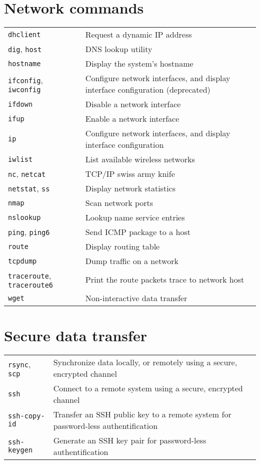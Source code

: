 \documentclass[10pt]{article}
\begin{document}
\begin{multicols}{2}

\section{Network commands}
\begin{tabular}{ p{2.5cm} p{8.5cm} }
  \hline
  \texttt{dhclient} & Request a dynamic IP address \\
  \rowcolor{Gray}
  \texttt{dig}, \texttt{host} & DNS lookup utility \\
  \texttt{hostname} & Display the system's hostname \\
  \rowcolor{Gray}
  \texttt{ifconfig}, \texttt{iwconfig} & Configure network interfaces, and display interface configuration (deprecated)\\
  \texttt{ifdown} & Disable a network interface \\
  \rowcolor{Gray}
  \texttt{ifup} & Enable a network interface \\
  \texttt{ip} & Configure network interfaces, and display interface configuration \\
  \rowcolor{Gray}
  \texttt{iwlist} & List available wireless networks \\
  \texttt{nc}, \texttt{netcat} & TCP/IP swiss army knife \\
  \rowcolor{Gray}
  \texttt{netstat}, \texttt{ss} & Display network statistics \\
  \texttt{nmap} & Scan network ports \\
  \rowcolor{Gray}
  \texttt{nslookup} & Lookup name service entries \\
  \texttt{ping}, \texttt{ping6} & Send ICMP package to a host \\
  \rowcolor{Gray}
  \texttt{route} & Display routing table \\
  \texttt{tcpdump} & Dump traffic on a network \\
  \rowcolor{Gray}
  \texttt{traceroute}, \texttt{traceroute6} & Print the route packets trace to network host\\
  \texttt{wget} & Non-interactive data transfer\\
  \hline
\end{tabular}

\section{Secure data transfer}
\begin{tabular}{ p{2.5cm} p{8.5cm} }
  \hline
  \texttt{rsync}, \texttt{scp} & Synchronize data locally, or remotely using a secure, encrypted channel \\
  \rowcolor{Gray}
  \texttt{ssh} & Connect to a remote system using a secure, encrypted channel\\
  \texttt{ssh-copy-id} & Transfer an SSH public key to a remote system for password-less authentification\\
  \rowcolor{Gray}
  \texttt{ssh-keygen} & Generate an SSH key pair for password-less authentification\\
  \hline
\end{tabular}


\end{multicols}
\end{document}
